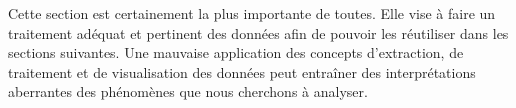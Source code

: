 Cette section est certainement la plus importante de toutes. Elle vise à faire un traitement adéquat et pertinent des données afin de pouvoir les réutiliser dans les sections suivantes. Une mauvaise application des concepts d’extraction, de traitement et de visualisation des données peut entraîner des interprétations aberrantes des phénomènes que nous cherchons à analyser.



